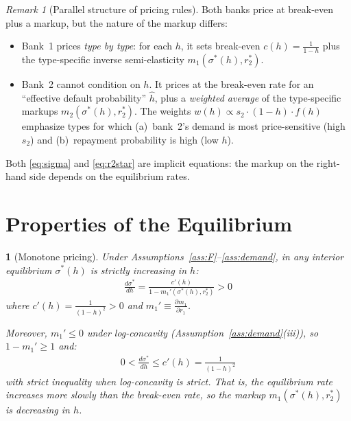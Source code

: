 \documentclass[12pt]{article}
\theoremstyle{plain}
\theoremstyle{plain}
\newtheorem{prop}[thm]{\protect\propositionname}
\theoremstyle{definition}  %
\theoremstyle{remark}  %
\newtheorem{remark}[thm]{Remark}  %
\providecommand{\propositionname}{Proposition}
\begin{document}
\begin{remark}[Parallel structure of pricing rules]\label{rem:parallel}
Both banks price at break-even plus a markup, but the nature of the markup differs:
\begin{itemize}
    \item Bank~1 prices \emph{type by type}: for each $h$, it sets break-even $c(h) = \frac{1}{1-h}$ plus the type-specific inverse semi-elasticity $m_1(\sigma^*(h), r_2^*)$.
    \item Bank~2 cannot condition on $h$. It prices at the break-even rate for an ``effective default probability'' $\hat{h}$, plus a \emph{weighted average} of the type-specific markups $m_2(\sigma^*(h), r_2^*)$. The weights $w(h) \propto s_2 \cdot (1-h) \cdot f(h)$ emphasize types for which (a)~bank~2's demand is most price-sensitive (high $s_2$) and (b)~repayment probability is high (low $h$).
\end{itemize}
Both \eqref{eq:sigma} and \eqref{eq:r2star} are implicit equations: the markup on the right-hand side depends on the equilibrium rates.
\end{remark}



\section{Properties of the Equilibrium}\label{sec:properties}

\begin{prop}[Monotone pricing]\label{prop:mono}
Under Assumptions~\ref{ass:F}--\ref{ass:demand}, in any interior equilibrium $\sigma^*(h)$ is strictly increasing in $h$:
\begin{align}\label{eq:dsigma}
    \frac{d\sigma^*}{dh} = \frac{c'(h)}{1 - m_1'(\sigma^*(h), r_2^*)} > 0
\end{align}
where $c'(h) = \frac{1}{(1-h)^2} > 0$ and $m_1' \equiv \frac{\partial m_1}{\partial r_1}$.

Moreover, $m_1' \leq 0$ under log-concavity (Assumption~\ref{ass:demand}(iii)), so $1 - m_1' \geq 1$ and:
\begin{align}\label{eq:dsigma_bound}
    0 < \frac{d\sigma^*}{dh} \leq c'(h) = \frac{1}{(1-h)^2}
\end{align}
with strict inequality when log-concavity is strict. That is, the equilibrium rate increases \emph{more slowly} than the break-even rate, so the markup $m_1(\sigma^*(h), r_2^*)$ is decreasing in $h$.
\end{prop}
\end{document}
